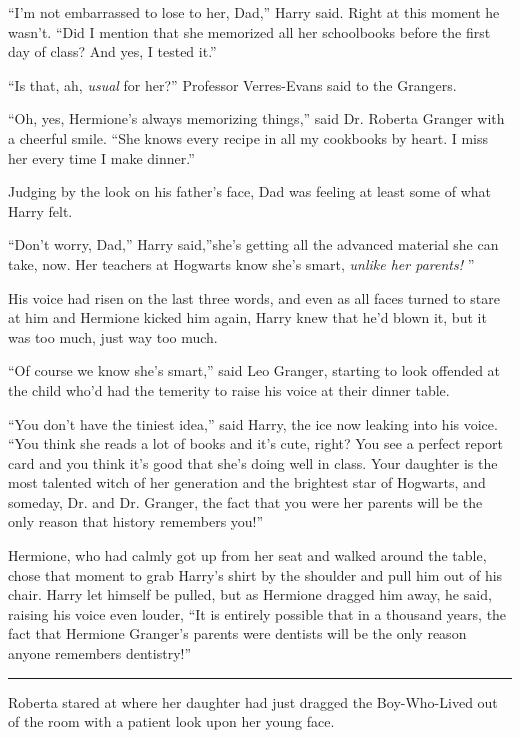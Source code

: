 ``I'm not embarrassed to lose to her, Dad,'' Harry said. Right at this
moment he wasn't. ``Did I mention that she memorized all her schoolbooks
before the first day of class? And yes, I tested it.''

``Is that, ah, \emph{usual} for her?'' Professor Verres-Evans said to the
Grangers.

``Oh, yes, Hermione's always memorizing things,'' said Dr. Roberta
Granger with a cheerful smile. ``She knows every recipe in all my
cookbooks by heart. I miss her every time I make dinner.''

Judging by the look on his father's face, Dad was feeling at least some
of what Harry felt.

``Don't worry, Dad,'' Harry said,''she's getting all the advanced
material she can take, now. Her teachers at Hogwarts know she's smart,
\emph{unlike her parents!} ''

His voice had risen on the last three words, and even as all faces
turned to stare at him and Hermione kicked him again, Harry knew that
he'd blown it, but it was too much, just way too much.

``Of course we know she's smart,'' said Leo Granger, starting to look
offended at the child who'd had the temerity to raise his voice at their
dinner table.

``You don't have the tiniest idea,'' said Harry, the ice now leaking
into his voice. ``You think she reads a lot of books and it's cute,
right? You see a perfect report card and you think it's good that she's
doing well in class. Your daughter is the most talented witch of her
generation and the brightest star of Hogwarts, and someday, Dr. and Dr.
Granger, the fact that you were her parents will be the only reason that
history remembers you!''

Hermione, who had calmly got up from her seat and walked around the
table, chose that moment to grab Harry's shirt by the shoulder and pull
him out of his chair. Harry let himself be pulled, but as Hermione
dragged him away, he said, raising his voice even louder, ``It is
entirely possible that in a thousand years, the fact that Hermione
Granger's parents were dentists will be the only reason anyone remembers
dentistry!''

\begin{center}\rule{3in}{0.4pt}\end{center}

Roberta stared at where her daughter had just dragged the Boy-Who-Lived
out of the room with a patient look upon her young face.

